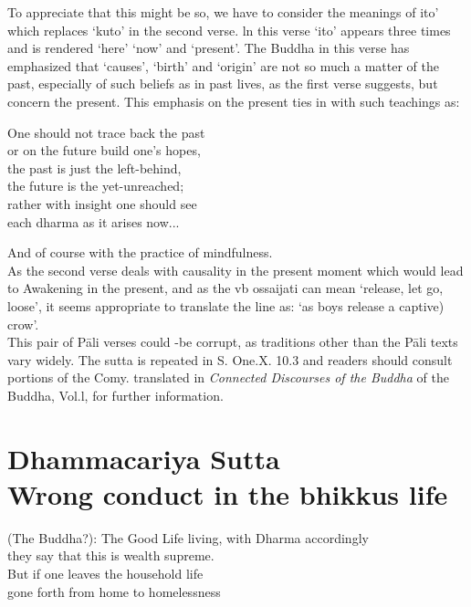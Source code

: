   To appreciate that this might be so, we have to consider the meanings of ito' which replaces `kuto' in the second verse. ln this verse `ito' appears three times and is rendered `here' `now' and `present'. The Buddha in this verse has emphasized that `causes', `birth' and `origin' are not so much a matter of the past, especially of such beliefs as in past lives, as the first verse suggests, but concern the present. This emphasis on the present ties in with such teachings as:
 
 \begin{MyDescription}[]{}
    One should not trace back the past\\
   or on the future build one's hopes,\\
   the past is just the left-behind,\\
   the future is the yet-unreached;\\
   rather with insight one should see\\
   each dharma as it arises now...
\end{MyDescription}

\begin{MyDescription}{}
\end{MyDescription}
And of course with the practice of mindfulness.\\

As the second verse deals with causality in the present moment which would lead to Awakening in the present, and as the vb ossaijati can mean `release, let go, loose', it seems appropriate to translate the line as: `as boys release a captive) crow'.\\

This pair of P\=ali verses could -be corrupt, as traditions other than the P\=ali texts vary widely. The sutta is repeated in S. One.X. 10.3 and readers should consult portions of the Comy. translated in \textit{Connected Discourses of the Buddha} of the Buddha, Vol.l, for further information.

   
   
   
\chapter{Dhammacariya Sutta\\  Wrong conduct in the bhikkus life}

\begin{MyDescription}{(The Buddha?):}
The Good Life living, with Dharma accordingly\\
they say that this is wealth supreme.\\
But if one leaves the household life\\
gone forth from home to homelessness
\end{MyDescription}

